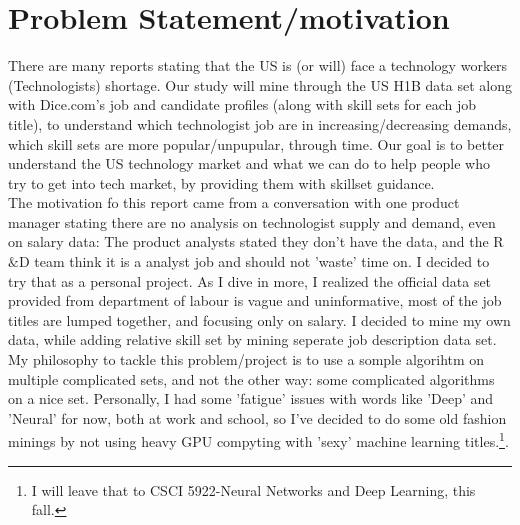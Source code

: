 \section{ Problem Statement/motivation}
	There are many reports stating that the US is (or will) face a technology workers (Technologists) shortage. Our study will mine through the US H1B data set along with Dice.com's job and candidate profiles (along with skill sets for each job title),  to understand which technologist job are in increasing/decreasing demands, which skill sets are more popular/unpupular, through time. Our goal is to better understand the US technology market and what we can do to help people who try to get into tech market, by providing them with skillset guidance. \\
	The motivation fo this report came from a conversation with one product manager stating there are no analysis on technologist supply and demand, even on salary data: The product analysts stated they don't have the data, and the R$\&$D team think it is a analyst job and should not 'waste' time on.  I decided to try that as a personal project. As I dive in more, I realized the official data set provided from department of labour is vague and uninformative, most of the job titles are lumped together, and focusing only on salary. I decided to mine my own data, while adding relative skill set by mining seperate job description data set.\\
	My philosophy to tackle this problem/project is to use a somple algorihtm on multiple complicated sets, and not the other way: some complicated  algorithms  on a nice set. Personally, I had some 'fatigue' issues with words like 'Deep' and 'Neural' for now, both at work and school, so I've decided to do some old fashion minings by not using heavy GPU compyting with 'sexy' machine learning titles.\footnote{I will leave that to CSCI 5922-Neural Networks and Deep Learning, this fall.}. 
